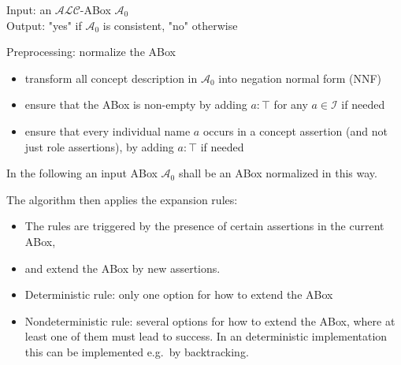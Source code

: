 \begin{mdframed}[frametitle= Description of the tableau algorithm, nobreak=true]
Input: an $\mathcal{ALC}$-ABox $\mathcal{A}_0$ \\
Output: "yes" if $\mathcal{A}_0$ is consistent, "no" otherwise

Preprocessing: normalize the ABox
\begin{itemize}
	\item transform all concept description in $\mathcal{A}_0$ into negation normal form (NNF)
	\item ensure that the ABox is non-empty by adding $a: \top$ for any $a \in \mathscr{I}$ if needed
	\item ensure that every individual name $a$ occurs in a concept assertion (and not just role assertions), by adding $a : \top$ if needed
\end{itemize}
In the following an input ABox $\mathcal{A}_0$ shall be an ABox normalized in this way.

The algorithm then applies the expansion rules:
\begin{itemize}
	\item The rules are triggered by the presence of certain assertions in the current ABox,
	\item and extend the ABox by new assertions.
	\item Deterministic rule: only one option for how to extend the ABox
	\item Nondeterministic rule: several options for how to extend the ABox, where at least one of them must lead to success.
		In an deterministic implementation this can be implemented e.g.\ by backtracking.
\end{itemize}
\end{mdframed}

